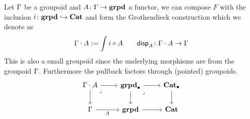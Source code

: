 \begin{defn}
  Let $\Gamma$ be a groupoid and $A \colon \Gamma \to \mathbf{grpd}$ a functor,
  we can compose $F$ with the inclusion $i \colon \mathbf{grpd} \hookrightarrow \mathbf{Cat}$
  and form the Grothendieck construction which we denote as
  \[ \Gamma \cdot A := \int i \circ A \quad \quad \mathsf{disp}_{A} \colon \Gamma \cdot A \to \Gamma\]
  This is also a small groupoid since the underlying morphisms are
  from the groupoid $\Gamma$.
  Furthermore the pullback factors through (pointed) groupoids.
  \[\begin{tikzcd}
    {\Ga \cdot A} & \ptgrpd & \ptCat \\
    \Ga & \grpd & \Cat \\
    {}
    \arrow[from=1-1, to=1-2]
    \arrow[from=1-1, to=2-1]
    \arrow["\lrcorner"{anchor=center, pos=0.125}, draw=none, from=1-1, to=2-2]
    \arrow[from=1-2, to=1-3]
    \arrow[from=1-2, to=2-2]
    \arrow["\lrcorner"{anchor=center, pos=0.125}, draw=none, from=1-2, to=2-3]
    \arrow[from=1-3, to=2-3]
    \arrow["A"', from=2-1, to=2-2]
    \arrow[from=2-2, to=2-3]
  \end{tikzcd}\]
\end{defn}

\medskip

